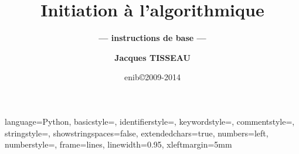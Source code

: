 


\newtheorem{rem}{Remarque}[section]
\newtheorem{defin}{Définition}[section]
\newtheorem{td}{\color{blue}TD}[section]

\lstset
{
language=Python,
basicstyle=\ttfamily,
identifierstyle=\ttfamily,
keywordstyle=\color{blue}\ttfamily,
commentstyle=\color{gray}\ttfamily,
stringstyle=\color{green}\ttfamily,
showstringspaces=false,
extendedchars=true,
numbers=left, 
numberstyle=\tiny,
frame=lines,
linewidth=0.95\textwidth,
xleftmargin=5mm
} 

\def\exo#1{\mbox{}\ \hfill\mbox{\color{blue}$\rule{2mm}{2mm}\,$\footnotesize\sc TD\ref{#1}}}
\def\exercice#1#2{\mbox{}\ \ TD \ref{#1}\ #2\ \dotfill\ \pageref{#1}\mbox{}}

\newenvironment{py}[1]{\begin{minipage}[t]{#1}\footnotesize}{\end{minipage}}

\graphicspath{{../../fig/}}


\title[Algorithmique]{\bf Initiation à l'algorithmique}
\subtitle{\bf --- instructions de base ---}

\author[\tt jacques.tisseau@enib.fr]{\large\bf Jacques TISSEAU}
\institute[\enib]{{\large\enib--\cerv}}
\date[enib\copyright 2009-2014]{\footnotesize enib\copyright 2009-2014}



